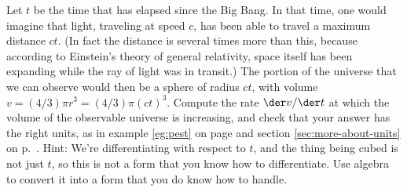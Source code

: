 Let $t$ be the time that has elapsed since the Big Bang. In that time, one would imagine that light, traveling at speed
$c$, has been able to travel a maximum distance $ct$. (In fact the distance is several times more than this, because
according to Einstein's theory of general relativity, space itself has been expanding while the ray of light was
in transit.) The portion of the universe that we can observe
would then be a sphere of radius $ct$, with volume $v=(4/3)\pi r^3=(4/3)\pi(ct)^3$. Compute the rate
$\der v/\der t$ at which the volume of the observable universe is increasing, and check that your answer has the right units,
as in example \ref{eg:pest} on page \pageref{eg:pest} and section \ref{sec:more-about-units} on p.~\pageref{sec:more-about-units}.
Hint: We're differentiating with respect to $t$, and the thing being cubed is not
just $t$, so this is not a form that you know how to differentiate. Use algebra
to convert it into a form that you do know how to handle.\answercheck
